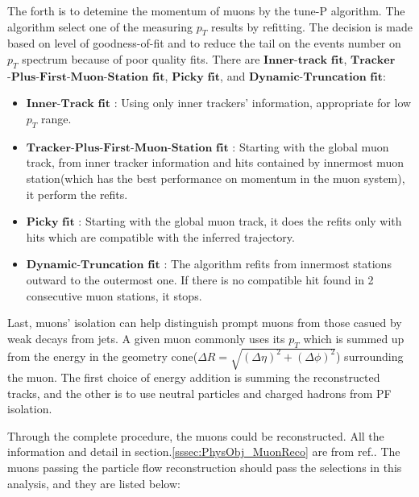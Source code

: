 			The forth is to detemine the momentum of muons by the tune-P algorithm\cite{collaboration_2012}. The algorithm select one of the measuring $p_T$ results by refitting. The decision is made based on level of goodness-of-fit and to reduce the tail on the events number on $p_T$ spectrum because of poor quality fits. There are $\textbf{Inner-track}$ $\textbf{fit}$, $\textbf{Tracker}$$\textbf{-Plus}$$\textbf{-First}$$\textbf{-Muon}$$\textbf{-Station}$ $\textbf{fit}$, $\textbf{Picky}$ $\textbf{fit}$, and $\textbf{Dynamic-Truncation}$ $\textbf{fit}$:

			\begin{itemize}
				\item $\textbf{Inner-Track fit}$ : Using only inner trackers' information, appropriate for low $p_T$ range.
				\item $\textbf{Tracker-Plus-First-Muon-Station fit}$ : Starting with the global muon track, from inner tracker information and hits contained by innermost muon station(which has the best performance on momentum in the muon system), it perform the refits.
				\item $\textbf{Picky fit}$ : Starting with the global muon track, it does the refits only with hits which are compatible with the inferred trajectory.
				\item $\textbf{Dynamic-Truncation fit}$ : The algorithm refits from innermost stations outward to the outermost one. If there is no compatible hit found in 2 consecutive muon stations, it stops.
			\label{PhysObj:itm:muon_p_reco}
			\end{itemize}

			Last, muons' isolation can help distinguish prompt muons from those casued by weak decays from jets. A given muon commonly uses its $p_T$ which is summed up from the energy in the geometry cone($\Delta R = \sqrt{(\Delta \eta)^2 + (\Delta \phi)^2}$) surrounding the muon. The first choice of energy addition is summing the reconstructed tracks, and the other is to use neutral particles and charged hadrons from PF isolation.


			Through the complete procedure, the muons could be reconstructed. All the information and detail in section.\ref{sssec:PhysObj_MuonReco} are from ref.\cite{Sirunyan:2018fpa}. The muons passing the particle flow reconstruction should pass the selections in this analysis, and they are listed below:

